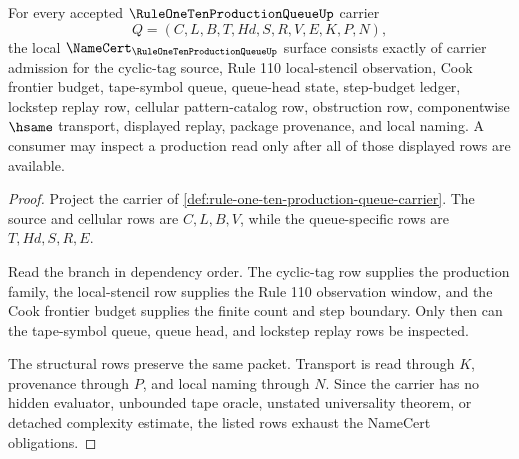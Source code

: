 \begin{theorem}
\label{thm:rule-one-ten-production-queue-namecert-obligations}
For every accepted $\RuleOneTenProductionQueueUp$ carrier
$$
Q=(C,L,B,T,Hd,S,R,V,E,K,P,N),
$$
the local $\NameCert_{\RuleOneTenProductionQueueUp}$ surface consists exactly of carrier admission for the cyclic-tag source, Rule 110 local-stencil observation, Cook frontier budget, tape-symbol queue, queue-head state, step-budget ledger, lockstep replay row, cellular pattern-catalog row, obstruction row, componentwise $\hsame$ transport, displayed replay, package provenance, and local naming. A consumer may inspect a production read only after all of those displayed rows are available.
\end{theorem}
\begin{proof}
Project the carrier of \autoref{def:rule-one-ten-production-queue-carrier}. The source and cellular rows are $C,L,B,V$, while the queue-specific rows are $T,Hd,S,R,E$.

Read the branch in dependency order. The cyclic-tag row supplies the production family, the local-stencil row supplies the Rule 110 observation window, and the Cook frontier budget supplies the finite count and step boundary. Only then can the tape-symbol queue, queue head, and lockstep replay rows be inspected.

The structural rows preserve the same packet. Transport is read through $K$, provenance through $P$, and local naming through $N$. Since the carrier has no hidden evaluator, unbounded tape oracle, unstated universality theorem, or detached complexity estimate, the listed rows exhaust the NameCert obligations.
\end{proof}

